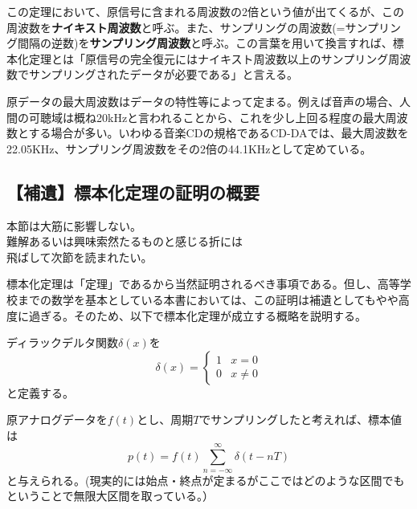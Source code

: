この定理において、原信号に含まれる周波数の2倍という値が出てくるが、この周波数を\textbf{ナイキスト周波数}と呼ぶ。また、サンプリングの周波数(=サンプリング間隔の逆数)を\textbf{サンプリング周波数}と呼ぶ。この言葉を用いて換言すれば、標本化定理とは「原信号の完全復元にはナイキスト周波数以上のサンプリング周波数でサンプリングされたデータが必要である」と言える。

原データの最大周波数はデータの特性等によって定まる。例えば音声の場合、人間の可聴域は概ね20kHzと言われることから、これを少し上回る程度の最大周波数とする場合が多い。いわゆる音楽CDの規格であるCD-DAでは、最大周波数を22.05KHz、サンプリング周波数をその2倍の44.1KHzとして定めている。

\subsection{【補遺】標本化定理の証明の概要}
\begin{center}
\begin{minipage}[]{0.75\linewidth}
\begin{screen}
\begin{center}
本節は大筋に影響しない。\\
難解あるいは興味索然たるものと感じる折には\\
飛ばして次節を読まれたい。
\end{center}
\end{screen}
\end{minipage}
\end{center}

標本化定理は「定理」であるから当然証明されるべき事項である。但し、高等学校までの数学を基本としている本書においては、この証明は補遺としてもやや高度に過ぎる。そのため、以下で標本化定理が成立する概略を説明する。

ディラックデルタ関数$\delta(x)$を
\begin{equation}
\delta(x)=\left\{
\begin{matrix}
1&x=0 \\
0&x\neq 0
\end{matrix}
\right.
\end{equation}
と定義する。

原アナログデータを$f(t)$とし、周期$T$でサンプリングしたと考えれば、標本値は
\begin{equation}
p(t)=f(t)\sum^{\infty}_{n=-\infty} \delta(t-nT)
\end{equation}
と与えられる。(現実的には始点・終点が定まるがここではどのような区間でもということで無限大区間を取っている。）

